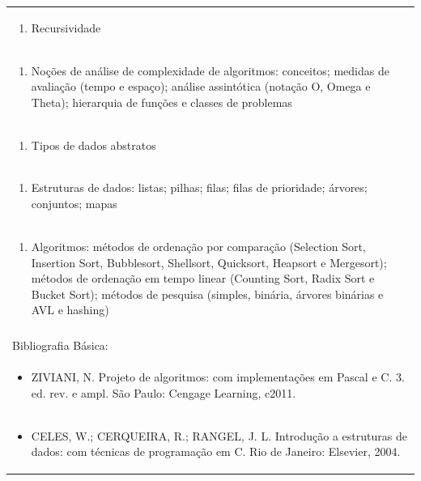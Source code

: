 \documentclass[11pt]{article}
\begin{document}
\begin{center}
\begin{longtable}{|p{4cm}|p{4cm}|p{4cm}|p{4cm}|}
\multicolumn{4}{|p{\dimexpr 16cm + 6\tabcolsep\relax}|}{\begin{enumerate}[start=2]\item Recursividade\end{enumerate}}\\
\multicolumn{4}{|p{\dimexpr 16cm + 6\tabcolsep\relax}|}{\begin{enumerate}[start=3]\item Noções de análise de complexidade de algoritmos: conceitos; medidas de avaliação (tempo e espaço); análise assintótica (notação O, Omega e Theta); hierarquia de funções e classes de problemas\end{enumerate}}\\
\multicolumn{4}{|p{\dimexpr 16cm + 6\tabcolsep\relax}|}{\begin{enumerate}[start=4]\item Tipos de dados abstratos\end{enumerate}}\\
\multicolumn{4}{|p{\dimexpr 16cm + 6\tabcolsep\relax}|}{\begin{enumerate}[start=5]\item Estruturas de dados: listas; pilhas; filas; filas de prioridade; árvores; conjuntos; mapas\end{enumerate}}\\
\multicolumn{4}{|p{\dimexpr 16cm + 6\tabcolsep\relax}|}{\begin{enumerate}[start=6]\item Algoritmos: métodos de ordenação por comparação (Selection Sort, Insertion Sort, Bubblesort, Shellsort, Quicksort, Heapsort e Mergesort); métodos de ordenação em tempo linear (Counting Sort, Radix Sort e Bucket Sort); métodos de pesquisa (simples, binária, árvores binárias e AVL e hashing)\end{enumerate}}\\
\multicolumn{4}{|p{\dimexpr 16cm + 6\tabcolsep\relax}|}{}\\
\hline
\multicolumn{4}{|p{16cm}|}{Bibliografia Básica:}\\*
\multicolumn{4}{|p{\dimexpr 16cm + 6\tabcolsep\relax}|}{\begin{itemize}\item ZIVIANI, N. Projeto de algoritmos: com implementações em Pascal e C. 3. ed. rev. e ampl. São Paulo: Cengage Learning, c2011.\end{itemize}}\\
\multicolumn{4}{|p{\dimexpr 16cm + 6\tabcolsep\relax}|}{\begin{itemize}\item CELES, W.; CERQUEIRA, R.; RANGEL, J. L. Introdução a estruturas de dados: com técnicas de programação em C. Rio de Janeiro: Elsevier, 2004.\end{itemize}}\\

\end{longtable}
\end{center}
\end{document}

